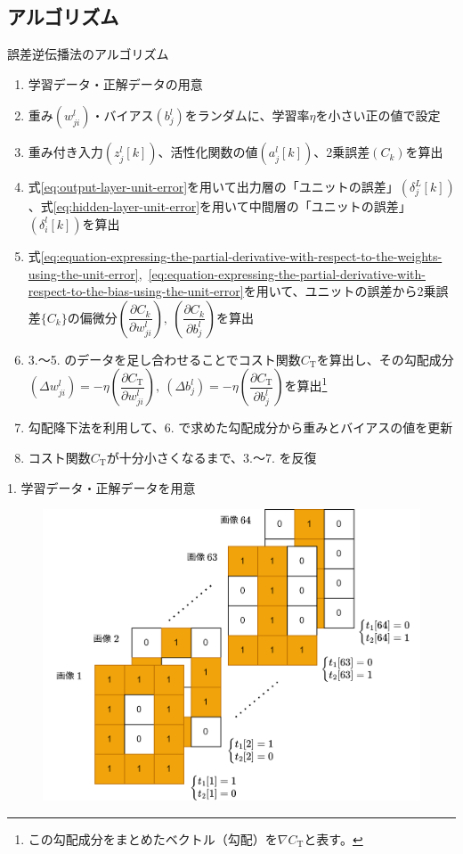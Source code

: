 \documentclass[dvipdfmx,aspectratio=169]{beamer}
\begin{document}
	\subsection{アルゴリズム}
	\begin{frame}[shrink]{誤差逆伝播法のアルゴリズム}
		\begin{enumerate}
			\item 学習データ・正解データの用意
			\item 重み$ (w^l_{ji}) $・バイアス$ (b^l_j) $をランダムに、学習率$ \eta $を小さい正の値で設定
			\item 重み付き入力$ (z^l_j[k]) $、活性化関数の値$ (a^l_j[k]) $、2乗誤差$ (C_k) $を算出
			\item 式\eqref{eq:output-layer-unit-error}を用いて出力層の「ユニットの誤差」$ (\delta^L_j[k]) $、式\eqref{eq:hidden-layer-unit-error}を用いて中間層の「ユニットの誤差」$ (\delta^l_i[k]) $を算出
			\item 式\eqref{eq:equation-expressing-the-partial-derivative-with-respect-to-the-weights-using-the-unit-error},\ \eqref{eq:equation-expressing-the-partial-derivative-with-respect-to-the-bias-using-the-unit-error}を用いて、ユニットの誤差から2乗誤差$ \{C_k\} $の偏微分$ \left( \dfrac{\partial C_k}{\partial w^l_{ji}} \right),\ \left( \dfrac{\partial C_k}{\partial b^l_j} \right) $を算出
			\item 3.～5. のデータを足し合わせることでコスト関数$ C_\mathrm{T} $を算出し、その勾配成分$ (\Delta w^l_{ji}) = -\eta\left( \dfrac{\partial C_\mathrm{T}}{\partial w^l_{ji}} \right),\ (\Delta b^l_j) = -\eta\left( \dfrac{\partial C_\mathrm{T}}{\partial b^l_j} \right) $を算出\footnote{この勾配成分をまとめたベクトル（勾配）を$ \nabla C_\mathrm{T} $と表す。}
			\item 勾配降下法を利用して、6. で求めた勾配成分から重みとバイアスの値を更新
			\item コスト関数$ C_\mathrm{T} $が十分小さくなるまで、3.～7. を反復\vspace{1em}
		\end{enumerate}
	\end{frame}
	\begin{frame}{1. 学習データ・正解データを用意}
		\begin{figure}
			\centering
			\includegraphics[width=0.65\linewidth]{img/prepare-training-data}
		\end{figure}
	\end{frame}
\end{document}

